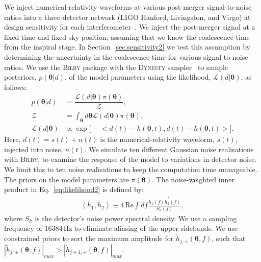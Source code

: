 \documentclass[../Thesis.tex]{subfiles}
\begin{document}
        We inject numerical-relativity waveforms at various post-merger signal-to-noise ratios into a three-detector network (LIGO Hanford, Livingston, and Virgo) at design sensitivity for each interferometer~\cite{PSD:aLIGO,PSD:aVirgo}. 
        We inject the post-merger signal at a fixed time and fixed sky position, assuming that we know the coalescence time from the inspiral stage. 
        In Section~\ref{sec:sensitivity2} we test this assumption by determining the uncertainty in the coalescence time for various signal-to-noise ratios.
        We use the {\textsc{Bilby}} package  \cite{Ashton2019} with the {\textsc{Dynesty}} sampler~\cite{Speagle2019} to sample posteriors, $p(\boldsymbol{\theta}|d)$, of the model parameters  using the likelihood, $\mathcal{L}(d | \boldsymbol{\theta})$, as follows:
        \begin{align}
        	p(\boldsymbol{\theta}|d) & =\dfrac{\mathcal{L}(d | \boldsymbol{\theta})\pi(\boldsymbol{\theta})}{\mathcal{Z}},\label{eq:posterior2}\\
        	\mathcal{Z} & =\int_{\boldsymbol{\theta}} d\boldsymbol{\theta} \mathcal{L}(d | \boldsymbol{\theta})\pi(\boldsymbol{\theta}),\label{eq:evidence2}\\
        	\mathcal{L}(d | \boldsymbol{\theta}) & \propto \exp\Big[-\Big<d(t)-h(\boldsymbol{\theta},t),d(t)-h(\boldsymbol{\theta},t)\Big>\Big]\label{eq:likelihood2}. 
        \end{align}        
        Here, $d(t)=s(t)+n(t)$ is the numerical-relativity waveform, $s(t)$, injected into noise, $n(t)$. 
        We simulate ten different Gaussian noise realisations with {\textsc{Bilby}}, to examine the response of the model to variations in detector noise. 
        We limit this to ten noise realisations to keep the computation time manageable.
        The priors on the model parameters are $\pi(\boldsymbol{\theta})$. 
        The noise-weighted inner product in Eq.~\ref{eq:likelihood2} is defined by:
        \begin{align}
        	\left<h_1,h_2\right>\equiv4\, \mathrm{Re} \int df\frac{\tilde{h}_1(f)\tilde{h}^{*}_2(f)}{S_h(f)},\label{eq:inner_product2}
        \end{align}
    where $S_h$ is the detector's noise power spectral density.
    We use a sampling frequency of 16384\,Hz to eliminate aliasing of the upper sidebands. 
    We use constrained priors to sort the maximum amplitude for $\tilde{h}_{j,+}(\boldsymbol{\theta},f)$, such that  $|\tilde{h}_{j,+}(\boldsymbol{\theta},f)|_{max} > |\tilde{h}_{j+1,+}(\boldsymbol{\theta},f)|_{max}$.
\end{document}
